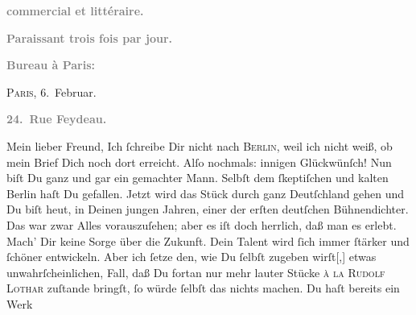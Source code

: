 \begin{ledgroupsized}[t]{13cm}
           \begin{otherlanguage}{french}\textcolor{gray}{\textbf{commercial et littéraire.}}\end{otherlanguage}\pend
           \pstart
           \begin{otherlanguage}{french}\textcolor{gray}{\textbf{\textbf{Paraissant trois fois par jour.}}}\end{otherlanguage}\pend
           \pstart
           \begin{otherlanguage}{french}\textcolor{gray}{\textbf{\textbf{Bureau à Paris:}}}\end{otherlanguage}\hfill \textsc{Paris}, 6. Februar.\pend
           \pstart
           \begin{otherlanguage}{french}\textcolor{gray}{\textbf{\textbf{24. Rue Feydeau.}}}\end{otherlanguage}\pend
           \pstart\center{}Mein lieber Freund,\pend\pstart
           Ich ſchreibe Dir nicht nach \textsc{Berlin}, weil ich nicht weiß, ob mein Brief Dich noch dort erreicht.\pend
           \pstart
           Alſo nochmals: innigen Glückwünſch! Nun biſt Du ganz und gar ein gemachter Mann.
               Selbſt dem ſkeptiſchen und kalten Berlin haſt Du
               gefallen. Jetzt wird das Stück
               durch ganz Deutſchland gehen\strikeout{,} und Du biſt heut, in Deinen jungen Jahren, einer der
               erſten deutſchen Bühnendichter. {\pb}Das war zwar Alles
               vorauszuſehen; aber es iſt doch herrlich, daß man es  erleb\strikeout{\textcolor{gray}{e}}t. Mach’ Dir keine Sorge über die Zukunft. Dein Talent wird ſich immer ſtärker
               und ſchöner entwickeln. Aber ich ſetze den, wie Du ſelbſt zugeben
                  wirſt{[},{]} etwas unwahrſcheinlichen, Fall, daß  Du fortan nur mehr lauter Stücke \textsc{à la}{ }\textsc{Rudolf Lothar} zuſtande bringſt, ſo würde ſelbſt das nichts machen. Du haſt bereits ein Werk

\end{ledgroupsized}
